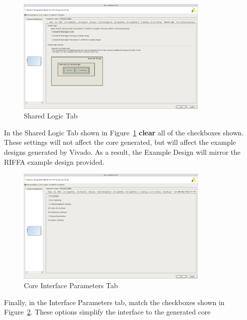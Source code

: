 \documentclass{refrep}
\newcommand{\ConfigSetting}[1]{\textbf{#1}}
\begin{document}
\begin{figure}[H]
  \includegraphics[width=350px,center]{7SeriesIntegratedTabSharedLogic.png}
  \caption{Shared Logic Tab}
  \label{Fig:7SeriesIntegrated:Generating:7SeriesIntegratedTabSharedLogic}
\end{figure}
In the Shared Logic Tab shown in
Figure~\ref{Fig:7SeriesIntegrated:Generating:7SeriesIntegratedTabSharedLogic}
\ConfigSetting{clear} all of the checkboxes shown. These settings will not affect the core
generated, but will affect the example designs generated by Vivado. As a result,
the Example Design will mirror the RIFFA example design provided.
\begin{figure}[H]
  \includegraphics[width=350px,center]{7SeriesIntegratedTabCoreInterfaceParameters.png}
  \caption{Core Interface Parameters Tab}
  \label{Fig:7SeriesIntegrated:Generating:7SeriesIntegratedTabInterfaceParameters}
\end{figure}
Finally, in the Interface Parameters tab, match the checkboxes shown in
Figure~\ref{Fig:7SeriesIntegrated:Generating:7SeriesIntegratedTabInterfaceParameters}. These
options simplify the interface to the generated core
\end{document}
